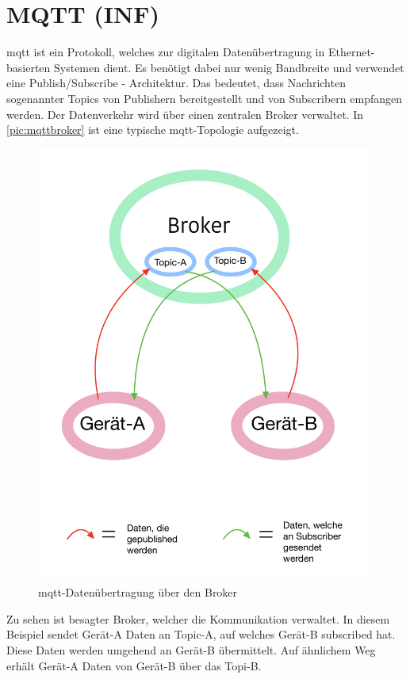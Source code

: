 \newpage
\section{MQTT (INF)} 
\label{sec:mqtt}
\acrfull{mqtt} ist ein Protokoll, welches zur digitalen Datenübertragung in Ethernet-basierten Systemen dient. Es benötigt dabei nur wenig Bandbreite und verwendet eine Publish/Subscribe - Architektur. Das bedeutet, dass Nachrichten sogenannter Topics von Publishern bereitgestellt und von Subscribern empfangen werden. Der Datenverkehr wird über einen zentralen Broker verwaltet. In \autoref{pic:mqttbroker} ist eine typische \acrshort{mqtt}-Topologie aufgezeigt. 

\begin{figure}[h]
    \begin{center}
        \includegraphics[width=11cm]{mqtt.pdf}
        \caption{
			\label{pic:mqttbroker}\acrshort{mqtt}-Datenübertragung über den Broker}
    \end{center}
\end{figure}
\newpage
Zu sehen ist besagter Broker, welcher die Kommunikation verwaltet. In diesem Beispiel sendet  Gerät-A Daten an Topic-A, auf welches Gerät-B subscribed hat. Diese Daten werden umgehend an Gerät-B übermittelt. Auf ähnlichem Weg erhält Gerät-A Daten von Gerät-B über das Topi-B.\\
